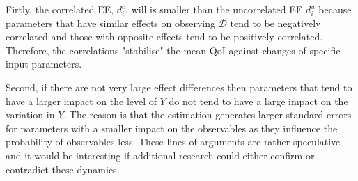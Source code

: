 Firtly, the correlated EE, $d_i^{c}$, will is smaller than the uncorrelated EE $d_i^{u}$ because parameters that have similar effects on observing $\pmb{\mathcal{D}}$ tend to be negatively correlated and those with opposite effects tend to be positively correlated. Therefore, the correlations "stabilise" the mean QoI against changes of specific input parameters.

Second, if there are not very large effect differences then parameters that tend to have a larger impact on the level of $Y$ do not tend to have a large impact on the variation in $Y$. The reason is that the estimation generates larger standard errors for parameters with a smaller impact on the observables as they influence the probability of observables less. These lines of arguments are rather speculative and it would be interesting if additional research could either confirm or contradict these dynamics.
